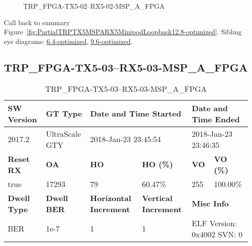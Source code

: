 \begin{figure}[h]
\caption{TRP\_FPGA-TX5-02--RX5-02-MSP\_A\_FPGA} \label{fig:TRPFPGATX502RX502MSPAFPGA12.8-optimized}
\end{figure}

Call back to summary Figure~\ref{fig:PartialTRPTX5MSPARX5MinipodLoopback12.8-optimized}.
Sibling eye diagrams: \hyperref[sec:TRPFPGATX502RX502MSPAFPGA6.4-optimized]{6.4-optimized}, \hyperref[sec:TRPFPGATX502RX502MSPAFPGA9.6-optimized]{9.6-optimized}.

\clearpage
\newpage


\subsection{TRP\_FPGA-TX5-03--RX5-03-MSP\_A\_FPGA}\label{sec:TRPFPGATX503RX503MSPAFPGA12.8-optimized}

\begin{table}[h]
\centering
\caption{TRP\_FPGA-TX5-03--RX5-03-MSP\_A\_FPGA}
\label{tab:TRPFPGATX503RX503MSPAFPGA12.8-optimized}
\begin{tabular}{@{}|l|l|l|l|l|l|@{}}
\toprule
\textbf{SW Version}                & \textbf{GT Type}   & \multicolumn{2}{l|}{\textbf{Date and Time Started}}            & \multicolumn{2}{l|}{\textbf{Date and Time Ended}}        \\ \midrule
2017.2                       & UltraScale GTY          & \multicolumn{2}{l|}{2018-Jan-23 23:45:54}                   & \multicolumn{2}{l|}{2018-Jan-23 23:46:35}               \\ \midrule
\textbf{Reset RX}                  & \textbf{OA} & \textbf{HO}   & \textbf{HO (\%)} & \textbf{VO} & \textbf{VO (\%)} \\ \midrule
true & 17293        & 79          & 60.47\%        & 255        & 100.00\%       \\ \midrule
\textbf{Dwell Type}                & \textbf{Dwell BER} & \textbf{Horizontal Increment} & \textbf{Vertical Increment}    & \multicolumn{2}{l|}{\textbf{Misc Info}}                  \\ \midrule
BER                            & 1e-7        & 1        & 1           & \multicolumn{2}{l|}{ELF Version: 0x4002 SVN: 0}                         \\ \bottomrule
\end{tabular}
\end{table}

